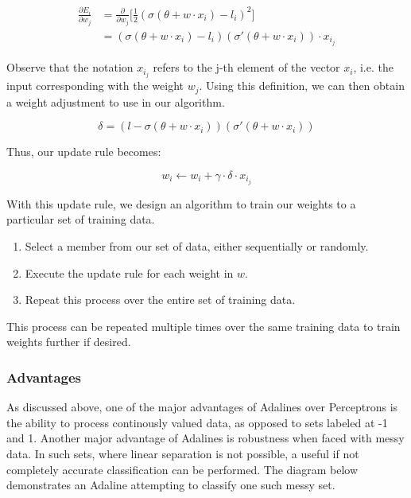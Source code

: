 \documentclass[a4paper, 11pt]{article} %
\begin{document}
\begin{equation}
\begin{split}
\frac{\partial E_i}{\partial w_j} & = \frac{\partial }{\partial w_j} \Big[\frac{1}{2}(\sigma (\theta + w \cdot x_i) - l_i)^2 \Big] \\
 & = (\sigma (\theta + w \cdot x_i) - l_i)(\sigma '(\theta + w \cdot x_i)) \cdot x_{i_j}
\end{split}
\end{equation}

Observe that the notation ${x_{i_j}}$ refers to the j-th element of the vector $x_i$, i.e. the input corresponding with the weight $w_j$.  Using this definition, we can then obtain a weight adjustment to use in our algorithm.

\begin{equation}
\delta = (l - \sigma (\theta + w \cdot x_i))(\sigma '(\theta + w \cdot x_i))
\end{equation}

Thus, our update rule becomes:

\begin{equation}
w_i \leftarrow w_i + \gamma \cdot \delta \cdot x_{i_j}
\end{equation}

With this update rule, we design an algorithm to train our weights to a particular set of training data.

\begin{enumerate}
	\item Select a member from our set of data, either sequentially or randomly.
	\item Execute the update rule for each weight in $w$.
	\item Repeat this process over the entire set of training data.
\end{enumerate}

This process can be repeated multiple times over the same training data to train weights further if desired.

\subsubsection*{Advantages}

As discussed above, one of the major advantages of Adalines over Perceptrons is the ability to process continously valued data, as opposed to sets labeled at -1 and 1.  Another major advantage of Adalines is robustness when faced with messy data.  In such sets, where linear separation is not possible, a useful if not completely accurate classification can be performed.  The diagram below demonstrates an Adaline attempting to classify one such messy set.
\end{document}
